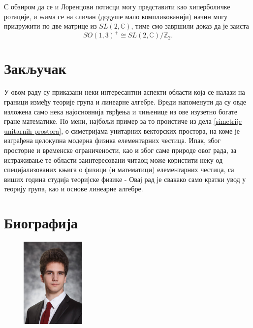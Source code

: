 \documentclass{report}
\theoremstyle{plain}
\theoremstyle{definition}
\begin{document}
С обзиром да се и Лоренцови потисци могу представити као хиперболичке ротације, и њима се на сличан (додуше мало компликованији) начин могу придружити по две матрице из $SL(2, \mathbb{C})$, тиме смо завршили доказ да је заиста
$$SO(1, 3)^+\cong SL(2, \mathbb{C})/\mathbb{Z}_2.$$


\chapter{Закључак}

У овом раду су приказани неки интересантни аспекти области која се налази на граници између теорије група и линеарне алгебре.
Вреди напоменути да су овде изложена само нека најосновнија тврђења и чињенице из ове изузетно богате гране математике. По мени, најбољи пример за то проистиче из дела \ref{simetrije unitarnih prostora}, о симетријама унитарних векторских простора, на коме је изграђена целокупна модерна физика елементарних честица. Ипак, због просторне и временске ограничености, као и због саме природе овог рада, за истраживање те области заинтересовани читаоц може користити неку од специјализованих књига о физици (и математици) елементарних честица, са виших година студија теоријске физике - Овај рад је свакако само кратки увод у теорију група, као и основе линеарне алгебре.

\nocite{*}



\chapter*{Биографија}

\begin{figure}
\vspace{-23pt}
	\begin{center}
	\includegraphics[width=0.28\textwidth]{slika.jpg}
	\end{center}
\end{figure}
\end{document}
